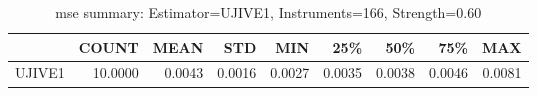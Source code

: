 \begin{table}[ht]
\centering
\caption{mse summary: Estimator=UJIVE1, Instruments=166, Strength=0.60}
\begin{tabular}{lrrrrrrrr}
\toprule
 & COUNT & MEAN & STD & MIN & 25\% & 50\% & 75\% & MAX \\
\midrule
UJIVE1 & 10.0000 & 0.0043 & 0.0016 & 0.0027 & 0.0035 & 0.0038 & 0.0046 & 0.0081 \\
\bottomrule
\end{tabular}
\end{table}
